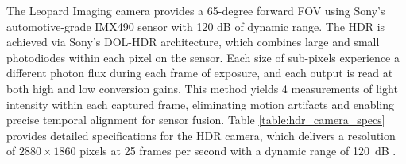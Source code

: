 \documentclass{erauthesis}
\begin{document}
The Leopard Imaging camera provides a 65-degree forward \ac{FOV} using Sony’s automotive-grade IMX490 sensor with 120 dB of dynamic range.
The \ac{HDR} is achieved via Sony’s \ac{DOL-HDR} architecture, which combines large and small photodiodes within each pixel on the sensor.
Each size of sub-pixels experience a different photon flux during each frame of exposure, and each output is read at both high and low conversion gains.
This method yields 4 measurements of light intensity within each captured frame, eliminating motion artifacts and enabling precise temporal alignment for sensor fusion.
Table \ref{table:hdr_camera_specs} provides detailed specifications for the HDR camera, which delivers a resolution of $2880 \times 1860$ pixels at 25 frames per second with a dynamic range of 120~dB
.%


\end{document}
